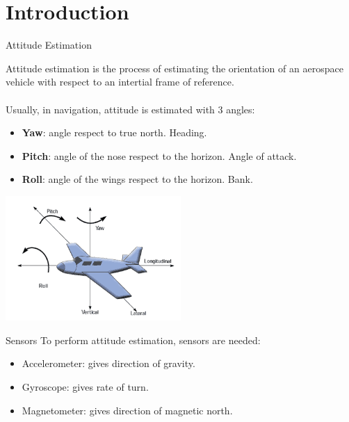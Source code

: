 \section{Introduction}
\begin{frame}{Attitude Estimation}

Attitude estimation is the process of estimating the orientation of an aerospace vehicle with respect to an intertial frame of reference. \\~\\

Usually, in navigation, attitude is estimated with 3 angles:
\begin{itemize}
\item \textbf{Yaw}: angle respect to true north. Heading.
\item \textbf{Pitch}: angle of the nose respect to the horizon. Angle of attack.
\item \textbf{Roll}: angle of the wings respect to the horizon. Bank.
\end{itemize}

\begin{center}
\includegraphics[width=0.5\textwidth]{figures/attitude.png}
\end{center}
\end{frame}


\begin{frame}{Sensors}
To perform attitude estimation, sensors are needed:
\begin{itemize}
\item Accelerometer: gives direction of gravity.
\item Gyroscope: gives rate of turn.
\item Magnetometer: gives direction of magnetic north.
\end{itemize}
\end{frame}